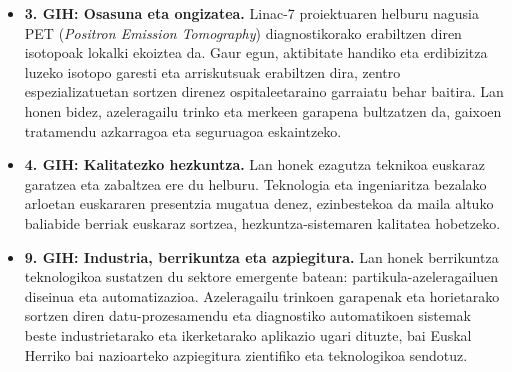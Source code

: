 \documentclass[12pt]{article}
\numberwithin{figure}{section}
\numberwithin{equation}{section}
\begin{document}
\begin{itemize}
    \item \textbf{3. GIH: Osasuna eta ongizatea.} Linac-7 proiektuaren helburu nagusia PET (\textit{Positron Emission Tomography}) diagnostikorako erabiltzen diren isotopoak lokalki ekoiztea da. Gaur egun, aktibitate handiko eta erdibizitza luzeko isotopo garesti eta arriskutsuak erabiltzen dira, zentro espezializatuetan sortzen direnez ospitaleetaraino garraiatu behar baitira. Lan honen bidez, azeleragailu trinko eta merkeen garapena bultzatzen da, gaixoen tratamendu azkarragoa eta seguruagoa eskaintzeko.
    \item \textbf{4. GIH: Kalitatezko hezkuntza.} Lan honek ezagutza teknikoa euskaraz garatzea eta zabaltzea ere du helburu. Teknologia eta ingeniaritza bezalako arloetan euskararen presentzia mugatua denez, ezinbestekoa da maila altuko baliabide berriak euskaraz sortzea, hezkuntza-sistemaren kalitatea hobetzeko.
    \item \textbf{9. GIH: Industria, berrikuntza eta azpiegitura.} Lan honek berrikuntza teknologikoa sustatzen du sektore emergente batean: partikula-azeleragailuen diseinua eta automatizazioa. Azeleragailu trinkoen garapenak eta horietarako sortzen diren datu-prozesamendu eta diagnostiko automatikoen sistemak beste industrietarako eta ikerketarako aplikazio ugari dituzte, bai Euskal Herriko bai nazioarteko azpiegitura zientifiko eta teknologikoa sendotuz.
    
\end{itemize}

\newpage
\printbibliography
\end{document}
